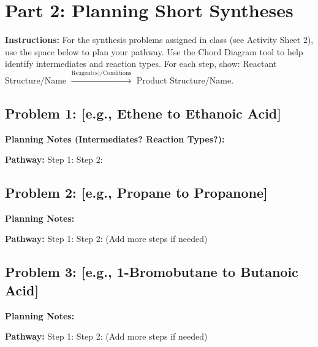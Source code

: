 \documentclass[11pt, a4paper]{article}
\begin{document}
\section*{Part 2: Planning Short Syntheses}

\textbf{Instructions:} For the synthesis problems assigned in class (see Activity Sheet 2), use the space below to plan your pathway. Use the Chord Diagram tool to help identify intermediates and reaction types. For each step, show: Reactant Structure/Name $\xrightarrow{\text{Reagent(s)/Conditions}}$ Product Structure/Name.

\subsection*{Problem 1: [e.g., Ethene to Ethanoic Acid]}
\textbf{Planning Notes (Intermediates? Reaction Types?):}
\vspace{1cm}

\textbf{Pathway:}
Step 1:
\vspace{2cm}
Step 2:
\vspace{2cm}

\subsection*{Problem 2: [e.g., Propane to Propanone]}
\textbf{Planning Notes:}
\vspace{1cm}

\textbf{Pathway:}
Step 1:
\vspace{2cm}
Step 2:
\vspace{2cm}
(Add more steps if needed)

\subsection*{Problem 3: [e.g., 1-Bromobutane to Butanoic Acid]}
\textbf{Planning Notes:}
\vspace{1cm}

\textbf{Pathway:}
Step 1:
\vspace{2cm}
Step 2:
\vspace{2cm}
(Add more steps if needed)
\end{document}
